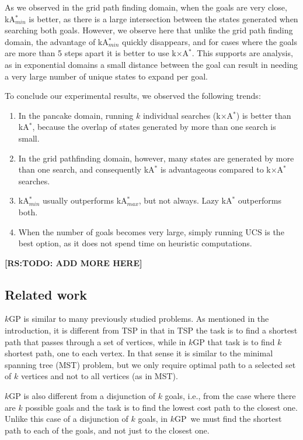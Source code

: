 \documentclass{aicom2e}
\newcommand{\kgs}{$k$GP}
\newcommand{\kastar}{kA$^*$}
\newcommand{\kastarmin}{kA$^*_{min}$}
\newcommand{\kastarmax}{kA$^*_{max}$}
\newcommand{\kxastar}{k$\times$A$^*$}
\newcommand{\roni}[1]{\textbf{[RS:#1]}}
\begin{document}
As we observed in the grid path finding domain, when the goals are very close, \kastarmin{} is better, as there is a large intersection between the states generated when searching both goals. However, we observe here that unlike the grid path finding domain, the advantage of \kastarmin{} quickly disappears, and for cases where the goals are more than 5 steps apart it is better to use \kxastar{}. This supports are analysis, as in exponential domains a small distance between the goal can result in needing a very large number of unique states to expand per goal.



To conclude our experimental results, we observed the following trends:
\begin{enumerate}
    \item In the pancake domain, running $k$ individual searches (\kxastar{}) is better than \kastar{}, because the overlap of states generated by more than one search is small.
    \item In the grid pathfinding domain, however, many states are generated by more than one search, and consequently \kastar{} is advantageous compared to \kxastar{} searches.
    \item \kastarmin{} usually outperforms \kastarmax{}, but not always. Lazy \kastar{} outperforms both.
    \item When the number of goals becomes very large, simply running UCS is the best option, as it does not spend time on heuristic computations.
\end{enumerate}

\roni{TODO: ADD MORE HERE}




\subsection{Related work}
\label{sec:related-work}

\kgs{} is similar to many previously studied problems. As mentioned in the introduction, it is different from TSP in that in TSP the task is to find a shortest path that passes through a set of vertices, while in \kgs{} that task is to find $k$ shortest path, one to each vertex. In that sense it is similar to the minimal spanning tree (MST) problem, but we only require optimal path to a selected set of $k$ vertices and not to all vertices (as in MST).


\kgs{} is also different from a disjunction of $k$ goals, i.e., from the case where there are $k$ possible goals and the task is to find the lowest cost path to the closest one. Unlike this case of a disjunction of $k$ goals, in \kgs\ we must find the shortest path to each of the goals, and not just to the closest one.
\end{document}

